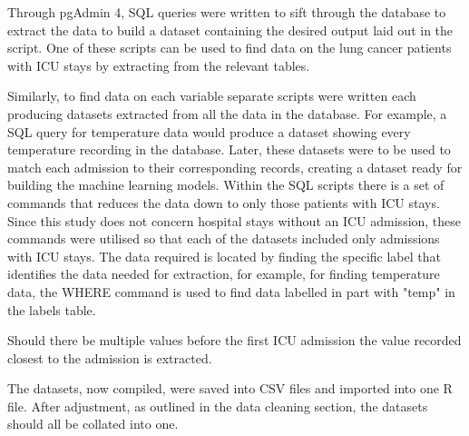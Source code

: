 \documentclass[11pt]{article}
\begin{document}
Through pgAdmin 4, SQL queries were written to sift through the database to extract the data to build a dataset containing the desired output laid out in the script. One of these scripts can be used to find data on the lung cancer patients with ICU stays by extracting from the relevant tables.

Similarly, to find data on each variable separate scripts were written each producing datasets extracted from all the data in the database. For example, a SQL query for temperature data would produce a dataset showing every temperature recording in the database. Later, these datasets were to be used to match each admission to their corresponding records, creating a dataset ready for building the machine learning models. Within the SQL scripts there is a set of commands that reduces the data down to only those patients with ICU stays. Since this study does not concern hospital stays without an ICU admission, these commands were utilised so that each of the datasets included only admissions with ICU stays. The data required is located by finding the specific label that identifies the data needed for extraction, for example, for finding temperature data, the WHERE command is used to find data labelled in part with "temp" in the labels table.

Should there be multiple values before the first ICU admission the value recorded closest to the admission is extracted. 

The datasets, now compiled, were saved into CSV files and imported into one R file. After adjustment, as outlined in the data cleaning section, the datasets should all be collated into one.

\end{document}
